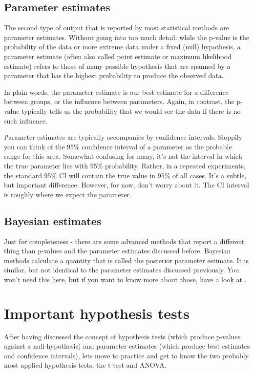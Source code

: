 \documentclass[a4paper,twoside]{tufte-book} %
\begin{document}
\subsection{Parameter estimates}

The second type of output that is reported by most statistical methods are parameter estimates. Without going into too much detail: while the p-value is the probability of the data or more extreme data under a fixed (null) hypothesis, a parameter estimate (often also called point estimate or maximum likelihood estimate) refers to those of many possible hypothesis that are spanned by a parameter that has the highest probability to produce the observed data. 

In plain words, the parameter estimate is our best estimate for a difference between groups, or the influence between parameters. Again, in contrast, the p-value typically tells us the probability that we would see the data if there is no such influence. 

Parameter estimates are typically accompanies by confidence intervals. Sloppily you can think of the 95\% confidence interval of a parameter as the probable range for this area. Somewhat confusing for many, it's not the interval in which the true parameter lies with 95\% probability. Rather, in a repeated experiments, the standard 95\% CI will contain the true value in 95\% of all cases. It's a subtle, but important difference. However, for now, don't worry about it. The CI interval is roughly where we expect the parameter. 

\subsection{Bayesian estimates}

Just for completeness - there are some advanced methods that report a different thing than p-values and the parameter estimates discussed before. Bayesian methods calculate a quantity that is called the posterior parameter estimate. It is similar, but not identical to the parameter estimates discussed previously. You won't need this here, but if you want to know more about those, have a look at \citep{Gelman-BayesianDataAnalysis-2003}.


\section{Important hypothesis tests}

After having discussed the concept of hypothesis tests (which produce p-values against a null-hypothesis) and parameter estimates (which produce best estimates and confidence intervals), lets move to practice and get to know the two probably most applied hypothesis tests, the t-test and ANOVA.
\end{document}
